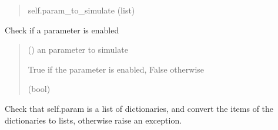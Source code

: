 \documentclass[letterpaper,10pt,english]{sphinxmanual}
\begin{document}
\begin{fulllineitems}
\begin{fulllineitems}
\begin{quote}
\begin{description}
\sphinxAtStartPar
self.param\_to\_simulate (list)

\end{description}\end{quote}

\end{fulllineitems}


\begin{fulllineitems}
\label{\detokenize{index:raypyng.simulate.SimulationParams._check_if_enabled}}
\pysigstartsignatures
{}
\pysigstopsignatures
\sphinxAtStartPar
Check if a parameter is enabled
\begin{quote}\begin{description}
\sphinxAtStartPar
{} () \textendash{} an parameter to simulate

\sphinxAtStartPar
True if the parameter is enabled, False otherwise

\sphinxAtStartPar
(bool)

\end{description}\end{quote}

\end{fulllineitems}


\begin{fulllineitems}
\label{\detokenize{index:raypyng.simulate.SimulationParams._check_param}}
\pysigstartsignatures
{}
\pysigstopsignatures
\sphinxAtStartPar
Check that self.param is a list of dictionaries, and convert the
items of the dictionaries to lists, otherwise raise an exception.

\end{fulllineitems}



\end{fulllineitems}
\end{document}
